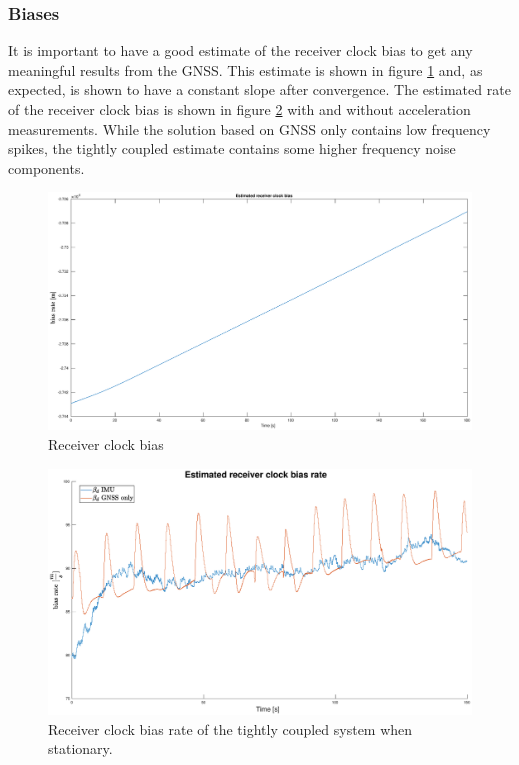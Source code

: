     \subsubsection{Biases}
    It is important to have a good estimate of the receiver clock bias to get any meaningful results from the GNSS. This estimate is shown in figure \ref{fig:bias} and, as expected, is shown to have a constant slope after convergence. The estimated rate of the receiver clock bias is shown in figure \ref{fig:bias-rate-stat} with and without acceleration measurements. While the solution based on GNSS only contains low frequency spikes, the tightly coupled estimate contains some higher frequency noise components.\\
    
    \begin{figure}
        \hspace{-1.5cm}
        \includegraphics[scale=0.3]{Results/Images/bias.eps}
        \caption{Receiver clock bias}
        \label{fig:bias}
    \end{figure}
    
    \begin{figure}
        \hspace{-1.5cm}
        \includegraphics[scale=0.3]{Results/Images/bias_rate-stat.eps}
        \caption{Receiver clock bias rate of the tightly coupled system when stationary.}
        \label{fig:bias-rate-stat}
    \end{figure}
    
